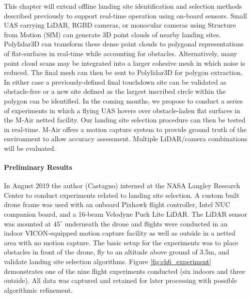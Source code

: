 
This chapter will extend offline landing site identification and selection methods described previously to support real-time operation using on-board sensors. Small UAS carrying LiDAR, RGBD cameras, or monocular cameras using Structure from Motion (SfM) can generate 3D point clouds of nearby landing sites. Polylidar3D can transform these dense point clouds to polygonal representations of flat-surfaces in real-time while accounting for obstacles.  Alternatively, many point cloud scans may be integrated into a larger cohesive mesh in which noise is reduced. The final mesh can then be sent to Polylidar3D for polygon extraction. In either case a previously-defined final touchdown site can be validated as obstacle-free or a new site defined as the largest inscribed circle within the polygon can be identified.
In the coming months, we propose to conduct a series of experiments in which a flying UAS hovers over obstacle-laden flat surfaces in the M-Air netted facility. Our landing site selection procedure can then be tested in real-time. M-Air offers a motion capture system to provide ground truth of the environment to allow accuracy assessment. Multiple LiDAR/camera combinations will be evaluated.


\paragraph{Preliminary Results}

In August 2019 the author (Castagno) interned at the NASA Langley Research Center to conduct experiments related to landing site selection. A custom built drone frame was used with an onboard Pixhawk flight controller, Intel NUC companion board, and a 16-beam Velodyne Puck Lite LiDAR. The LiDAR sensor was mounted at $45^{\circ}$ underneath the drone and flights were conducted in an indoor VICON-equipped motion capture facility as well as outside in a netted area with no motion capture. The basic setup for the experiments was to place obstacles in front of the drone, fly to an altitude above ground of 3.5m, and validate landing site selection algorithms. Figure \ref{fig:ch6_experiment} demonstrates one of the nine flight experiments conducted (six indoors and three outside). All data was captured and retained for later processing with possible algorithmic refinement.

